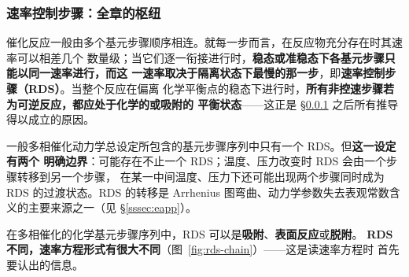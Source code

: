 \subsubsection{速率控制步骤：全章的枢纽}
\label{sssec:rds}

催化反应一般由多个基元步骤顺序相连。就每一步而言，在反应物充分存在时其速率可以相差几个
数量级；当它们逐一衔接进行时，\textbf{稳态或准稳态下各基元步骤只能以同一速率进行，而这
一速率取决于隔离状态下最慢的那一步}，即\textbf{速率控制步骤（RDS）}。当整个反应在偏离
化学平衡点的稳态下进行时，\textbf{所有非控速步骤若为可逆反应，都应处于化学的或吸附的
平衡状态}——这正是 §\ref{sssec:rds} 之后所有推导得以成立的原因。

一般多相催化动力学总设定所包含的基元步骤序列中只有一个 RDS。但\textbf{这一设定有两个
明确边界}：可能存在不止一个 RDS；温度、压力改变时 RDS 会由一个步骤转移到另一个步骤，
在某一中间温度、压力下还可能出现两个步骤同时成为 RDS 的过渡状态。RDS 的转移是 Arrhenius
图弯曲、动力学参数失去表观常数含义的主要来源之一（见 §\ref{sssec:eapp}）。

在多相催化的化学基元步骤序列中，RDS 可以是\textbf{吸附}、\textbf{表面反应}或\textbf{脱附}。
\textbf{RDS 不同，速率方程形式有很大不同}（图~\ref{fig:rds-chain}）——这是读速率方程时
首先要认出的信息。

